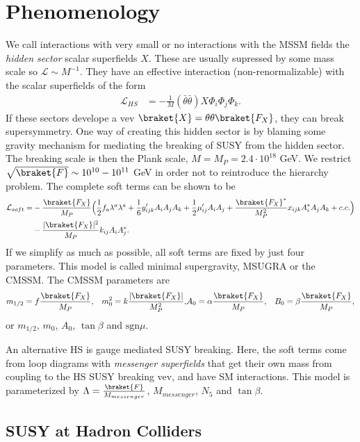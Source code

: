 \documentclass[twoside,english]{uiofysmaster}
\begin{document}
\section{Phenomenology}
We call interactions with very small or no interactions with the MSSM fields the \textit{hidden sector} scalar superfields $X$. These are usually supressed by some mass scale so $\mathcal{L} \sim M^{-1}$. They have an effective interaction (non-renormalizable) with the scalar superfields of the form
\begin{align}
\mathcal{L}_{HS} &= - \frac{1}{M} (\bar{\theta} \bar{\theta}) X \Phi_i \Phi_j \Phi_k.
\end{align}
If these sectors develope a vev $\braket{X} = \theta \theta\braket{F_X}$, they can break supersymmetry. One way of creating this hidden sector is by blaming some gravity mechanism for mediating the breaking of SUSY from the hidden sector. The breaking scale is then the Plank scale, $M = M_P = 2.4 \cdot 10^{18}$ GeV. We restrict $\sqrt{\braket{F}} \sim 10^{10} - 10^{11}$ GeV in order not to reintroduce the hierarchy problem.  The complete soft terms can be shown to be
\begin{align*}
\mathcal{L}_{soft} =& - \frac{\braket{F_X}}{M_P} \Big( \frac{1}{2} f_a \lambda^a \lambda^a + \frac{1}{6} y_{ijk}'A_i A_j A_k + \frac{1}{2} \mu_{ij}' A_i A_j + \frac{\braket{F_X}^*}{M_P^2}  x_{ijk} A_i^* A_j A_k + c.c.\Big)\\
&- \frac{|\braket{F_X}|^2}{M_P} k_{ij}A_i A_j^*.
\end{align*}
If we simplify as much as possible, all soft terms are fixed by just four parameters. This model is called minimal supergravity, MSUGRA or the CMSSM. The CMSSM parameters are
\begin{align}
&m_{1/2} = f \frac{\braket{F_X}}{M_P}, & m_0^2 = k \frac{|\braket{F_X}|}{M_P^2}, 
& A_0 = \alpha \frac{\braket{F_X}}{M_P}, &B_0 = \beta \frac{\braket{F_X}}{M_P},
\end{align}
or $m_{1/2}$, $m_0$, $A_0$, $\tan \beta$ and $\text{sgn} \mu$.

An alternative HS is gauge mediated SUSY breaking. Here, the soft terms come from loop diagrams with \textit{messenger superfields} that get their own mass from coupling to the HS SUSY breaking vev, and have SM interactions. This model is parameterized by $\Lambda = \frac{\braket{F}}{M_{messenger}}$, $M_{messenger}$, $N_5$ and $\tan \beta$.

\subsection{SUSY at Hadron Colliders}
\end{document}
